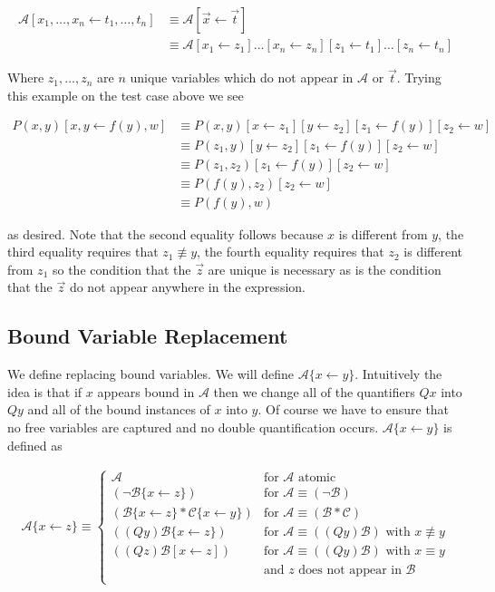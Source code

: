 \documentclass[12pt]{article}
\newcommand{\mc}[1]{\mathcal{#1}}
\begin{document}
\begin{align}
\mc{A}[x_1,\ldots, x_n \leftarrow t_1,\ldots, t_n] &\equiv \mc{A}[\vec{x}\leftarrow \vec{t}]\\
&\equiv \mc{A}[x_1\leftarrow z_1]\ldots[x_n\leftarrow z_n][z_1\leftarrow t_1]\ldots [z_n\leftarrow t_n]
\end{align}

Where $z_1,\ldots, z_n$ are $n$ unique variables which do not appear in $\mc{A}$ or $\vec{t}$. Trying this example on the test case above we see

\begin{align}
P(x,y)[x,y\leftarrow f(y),w] &\equiv P(x,y)[x\leftarrow z_1][y\leftarrow z_2][z_1\leftarrow f(y)][z_2\leftarrow w]\\
&\equiv P(z_1,y)[y\leftarrow z_2][z_1\leftarrow f(y)][z_2\leftarrow w]\\
&\equiv P(z_1,z_2)[z_1\leftarrow f(y)][z_2\leftarrow w]\\
&\equiv P(f(y),z_2)[z_2\leftarrow w]\\
&\equiv P(f(y),w)
\end{align}

as desired. Note that the second equality follows because $x$ is different from $y$, the third equality requires that $z_1 \not\equiv y$, the fourth equality requires that $z_2$ is different from $z_1$ so the condition that the $\vec{z}$ are unique is necessary as is the condition that the $\vec{z}$ do not appear anywhere in the expression.

\subsection{Bound Variable Replacement}

We define replacing bound variables. We will define $\mc{A}\{x\leftarrow y\}$. Intuitively the idea is that if $x$ appears bound in $\mc{A}$ then we change all of the quantifiers $Qx$ into $Qy$ and all of the bound instances of $x$ into $y$. Of course we have to ensure that no free variables are captured and no double quantification occurs. $\mc{A}\{x\leftarrow y\}$ is defined as

\begin{align}
\mc{A}\{x\leftarrow z\} \equiv \begin{cases}
\mc{A} & \text{for } \mc{A} \text{ atomic}\\
(\lnot \mc{B}\{x\leftarrow z\}) & \text{for } \mc{A}\equiv (\lnot \mc{B})\\
(\mc{B}\{x\leftarrow z\} \ast \mc{C}\{x\leftarrow y\}) & \text{for } \mc{A}\equiv (\mc{B} \ast \mc{C})\\
((Qy)\mc{B}\{x\leftarrow z\}) & \text{for } \mc{A} \equiv ((Qy)\mc{B}) \text{ with } x\not\equiv y\\
((Qz)\mc{B}[x\leftarrow z]) & \text{for } \mc{A} \equiv ((Qy)\mc{B}) \text{ with } x\equiv y\\
&\text{and } z \text{ does not appear in } \mc{B}\\
\end{cases}
\end{align}
\end{document}

